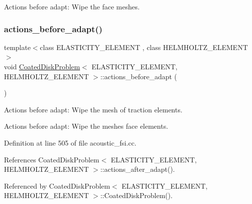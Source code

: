 Actions before adapt\+: Wipe the face meshes. 

\mbox{\label{classCoatedDiskProblem_a89e972df172b024b1358f0fac7646d6d}} 
\subsubsection{\texorpdfstring{actions\+\_\+before\+\_\+adapt()}{actions\_before\_adapt()}\hspace{0.1cm}{\footnotesize\ttfamily [2/2]}}
{\footnotesize\ttfamily template$<$class E\+L\+A\+S\+T\+I\+C\+I\+T\+Y\+\_\+\+E\+L\+E\+M\+E\+NT , class H\+E\+L\+M\+H\+O\+L\+T\+Z\+\_\+\+E\+L\+E\+M\+E\+NT $>$ \\
void \hyperlink{classCoatedDiskProblem}{Coated\+Disk\+Problem}$<$ E\+L\+A\+S\+T\+I\+C\+I\+T\+Y\+\_\+\+E\+L\+E\+M\+E\+NT, H\+E\+L\+M\+H\+O\+L\+T\+Z\+\_\+\+E\+L\+E\+M\+E\+NT $>$\+::actions\+\_\+before\+\_\+adapt (\begin{DoxyParamCaption}{ }\end{DoxyParamCaption})}



Actions before adapt\+: Wipe the mesh of traction elements. 

Actions before adapt\+: Wipe the meshes face elements. 

Definition at line 505 of file acoustic\+\_\+fsi.\+cc.



References Coated\+Disk\+Problem$<$ E\+L\+A\+S\+T\+I\+C\+I\+T\+Y\+\_\+\+E\+L\+E\+M\+E\+N\+T, H\+E\+L\+M\+H\+O\+L\+T\+Z\+\_\+\+E\+L\+E\+M\+E\+N\+T $>$\+::actions\+\_\+after\+\_\+adapt().



Referenced by Coated\+Disk\+Problem$<$ E\+L\+A\+S\+T\+I\+C\+I\+T\+Y\+\_\+\+E\+L\+E\+M\+E\+N\+T, H\+E\+L\+M\+H\+O\+L\+T\+Z\+\_\+\+E\+L\+E\+M\+E\+N\+T $>$\+::\+Coated\+Disk\+Problem().

\mbox{\label{classCoatedDiskProblem_a8f52f13933fba3b053d50de544d8cafc}} 

